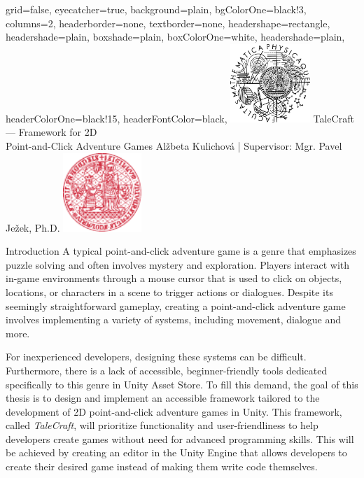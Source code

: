 \documentclass[portrait,a0paper,fontscale=0.35]{baposter}
\begin{document}
\color{black!80} %
\begin{poster}{grid=false,
	eyecatcher=true,
	background=plain,
	bgColorOne=black!3, %
	columns=2,
	headerborder=none,
	textborder=none,
	headershape=rectangle,
	headershade=plain,
	boxshade=plain,
	boxColorOne=white,
	headershade=plain,
	headerColorOne=black!15, %
	headerFontColor=black,
	}%
	{\includegraphics[height=8em]{logos/mff-black.pdf}}
	{TaleCraft — Framework for 2D\\ Point-and-Click Adventure Games}
	{\vspace{1ex} Alžbeta Kulichová | Supervisor: Mgr. Pavel Ježek, Ph.D.}
	{\includegraphics[height=8em]{logos/uk-red.pdf}}


%
%

\begin{posterbox}[column=0, span=1, name=background]{Introduction}
A typical point-and-click adventure game is a genre that emphasizes puzzle solving and often involves mystery and exploration. Players interact with in-game environments through a mouse cursor that is used to click on objects, locations, or characters in a scene to trigger actions or dialogues. Despite its seemingly straightforward gameplay, creating a point-and-click adventure game involves implementing a variety of systems, including movement, dialogue and more. 

For inexperienced developers, designing these systems can be difficult. Furthermore, there is a lack of accessible, beginner-friendly tools dedicated specifically to this genre in Unity Asset Store. To fill this demand, the goal of this thesis is to design and implement an accessible framework tailored to the development of 2D point-and-click adventure games in Unity. This framework, called \textit{TaleCraft}, will prioritize functionality and user-friendliness to help developers create games without need for advanced programming skills. This will be achieved by creating an editor in the Unity Engine that allows developers to create their desired game instead of making them write code themselves.
\end{posterbox}


\end{poster}
\end{document}
